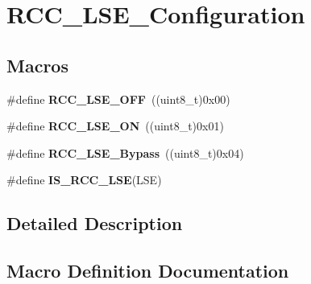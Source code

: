 \hypertarget{group___r_c_c___l_s_e___configuration}{}\section{R\+C\+C\+\_\+\+L\+S\+E\+\_\+\+Configuration}
\label{group___r_c_c___l_s_e___configuration}
\subsection*{Macros}
\begin{DoxyCompactItemize}
\item 
\hypertarget{group___r_c_c___l_s_e___configuration_ga6645c27708d0cad1a4ab61d2abb24c77}{}\#define {\bfseries R\+C\+C\+\_\+\+L\+S\+E\+\_\+\+O\+F\+F}~((uint8\+\_\+t)0x00)\label{group___r_c_c___l_s_e___configuration_ga6645c27708d0cad1a4ab61d2abb24c77}

\item 
\hypertarget{group___r_c_c___l_s_e___configuration_gac981ea636c2f215e4473901e0912f55a}{}\#define {\bfseries R\+C\+C\+\_\+\+L\+S\+E\+\_\+\+O\+N}~((uint8\+\_\+t)0x01)\label{group___r_c_c___l_s_e___configuration_gac981ea636c2f215e4473901e0912f55a}

\item 
\hypertarget{group___r_c_c___l_s_e___configuration_gac911af00bffa1bd1b1676f582a8a88e1}{}\#define {\bfseries R\+C\+C\+\_\+\+L\+S\+E\+\_\+\+Bypass}~((uint8\+\_\+t)0x04)\label{group___r_c_c___l_s_e___configuration_gac911af00bffa1bd1b1676f582a8a88e1}

\item 
\#define {\bfseries I\+S\+\_\+\+R\+C\+C\+\_\+\+L\+S\+E}(L\+S\+E)
\end{DoxyCompactItemize}


\subsection{Detailed Description}


\subsection{Macro Definition Documentation}
\hypertarget{group___r_c_c___l_s_e___configuration_ga95d2678bf8f46e932e7cba75619a4d2c}{}
